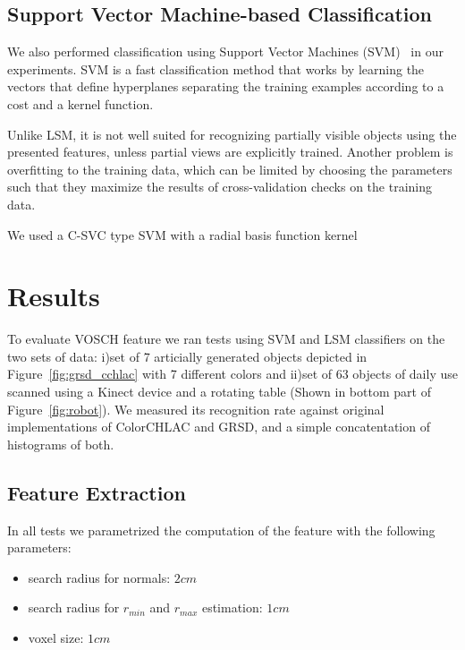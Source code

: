 \documentclass[conference]{sty/IEEEtran}
\begin{document}
\subsection{Support Vector Machine-based Classification}
We also performed classification using Support Vector Machines (SVM)~\cite{svm99} in our experiments.
SVM is a fast classification method that works by learning the vectors that define hyperplanes separating
the training examples according to a cost and a kernel function.

Unlike LSM, it is not well suited for recognizing partially visible objects using the presented features,
unless partial views are explicitly trained. Another problem is overfitting to the training data, which
can be limited by choosing the parameters such that they maximize the results of cross-validation checks
on the training data.

We used a C-SVC type SVM with a radial basis function kernel \cite{LIBSVM}

\section{Results}
\label{sec:results}
To evaluate VOSCH feature we ran 
tests using SVM and LSM classifiers on the two sets of data: 
i)set of 7 articially generated objects depicted in Figure~\ref{fig:grsd_cchlac}
with 7 different colors and ii)set of 63 objects of daily use scanned using
a Kinect device and a rotating table (Shown in bottom part of Figure~\ref{fig:robot}). 
We measured its recognition rate against original implementations of ColorCHLAC and 
GRSD, and a simple concatentation of histograms of both.

\subsection{Feature Extraction}
\label{sec:feature_extraction}
In all tests we parametrized the computation of the feature with the following parameters:
\begin{itemize}
\item search radius for normals: $2cm$
\item search radius for $r_{min}$ and $r_{max}$ estimation: $1cm$
\item voxel size: $1cm$
\end{itemize}
\end{document}
